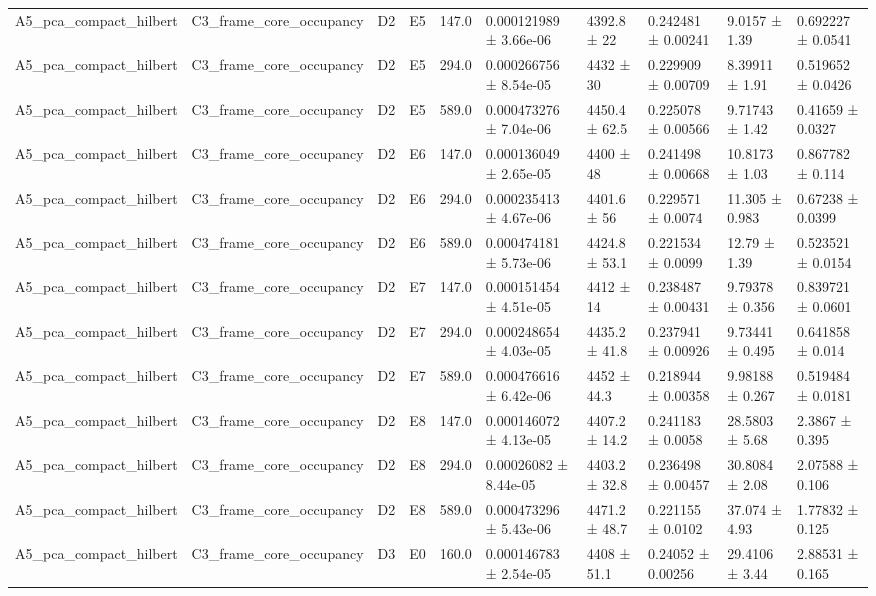 \begin{table}
\begin{tabular}{llllllllll}
A5\_pca\_compact\_hilbert & C3\_frame\_core\_occupancy & D2 & E5 & 147.0 & 0.000121989 ± 3.66e-06 & 4392.8 ± 22 & 0.242481 ± 0.00241 & 9.0157 ± 1.39 & 0.692227 ± 0.0541 \\
A5\_pca\_compact\_hilbert & C3\_frame\_core\_occupancy & D2 & E5 & 294.0 & 0.000266756 ± 8.54e-05 & 4432 ± 30 & 0.229909 ± 0.00709 & 8.39911 ± 1.91 & 0.519652 ± 0.0426 \\
A5\_pca\_compact\_hilbert & C3\_frame\_core\_occupancy & D2 & E5 & 589.0 & 0.000473276 ± 7.04e-06 & 4450.4 ± 62.5 & 0.225078 ± 0.00566 & 9.71743 ± 1.42 & 0.41659 ± 0.0327 \\
A5\_pca\_compact\_hilbert & C3\_frame\_core\_occupancy & D2 & E6 & 147.0 & 0.000136049 ± 2.65e-05 & 4400 ± 48 & 0.241498 ± 0.00668 & 10.8173 ± 1.03 & 0.867782 ± 0.114 \\
A5\_pca\_compact\_hilbert & C3\_frame\_core\_occupancy & D2 & E6 & 294.0 & 0.000235413 ± 4.67e-06 & 4401.6 ± 56 & 0.229571 ± 0.0074 & 11.305 ± 0.983 & 0.67238 ± 0.0399 \\
A5\_pca\_compact\_hilbert & C3\_frame\_core\_occupancy & D2 & E6 & 589.0 & 0.000474181 ± 5.73e-06 & 4424.8 ± 53.1 & 0.221534 ± 0.0099 & 12.79 ± 1.39 & 0.523521 ± 0.0154 \\
A5\_pca\_compact\_hilbert & C3\_frame\_core\_occupancy & D2 & E7 & 147.0 & 0.000151454 ± 4.51e-05 & 4412 ± 14 & 0.238487 ± 0.00431 & 9.79378 ± 0.356 & 0.839721 ± 0.0601 \\
A5\_pca\_compact\_hilbert & C3\_frame\_core\_occupancy & D2 & E7 & 294.0 & 0.000248654 ± 4.03e-05 & 4435.2 ± 41.8 & 0.237941 ± 0.00926 & 9.73441 ± 0.495 & 0.641858 ± 0.014 \\
A5\_pca\_compact\_hilbert & C3\_frame\_core\_occupancy & D2 & E7 & 589.0 & 0.000476616 ± 6.42e-06 & 4452 ± 44.3 & 0.218944 ± 0.00358 & 9.98188 ± 0.267 & 0.519484 ± 0.0181 \\
A5\_pca\_compact\_hilbert & C3\_frame\_core\_occupancy & D2 & E8 & 147.0 & 0.000146072 ± 4.13e-05 & 4407.2 ± 14.2 & 0.241183 ± 0.0058 & 28.5803 ± 5.68 & 2.3867 ± 0.395 \\
A5\_pca\_compact\_hilbert & C3\_frame\_core\_occupancy & D2 & E8 & 294.0 & 0.00026082 ± 8.44e-05 & 4403.2 ± 32.8 & 0.236498 ± 0.00457 & 30.8084 ± 2.08 & 2.07588 ± 0.106 \\
A5\_pca\_compact\_hilbert & C3\_frame\_core\_occupancy & D2 & E8 & 589.0 & 0.000473296 ± 5.43e-06 & 4471.2 ± 48.7 & 0.221155 ± 0.0102 & 37.074 ± 4.93 & 1.77832 ± 0.125 \\
A5\_pca\_compact\_hilbert & C3\_frame\_core\_occupancy & D3 & E0 & 160.0 & 0.000146783 ± 2.54e-05 & 4408 ± 51.1 & 0.24052 ± 0.00256 & 29.4106 ± 3.44 & 2.88531 ± 0.165 \\

\end{tabular}
\end{table}
